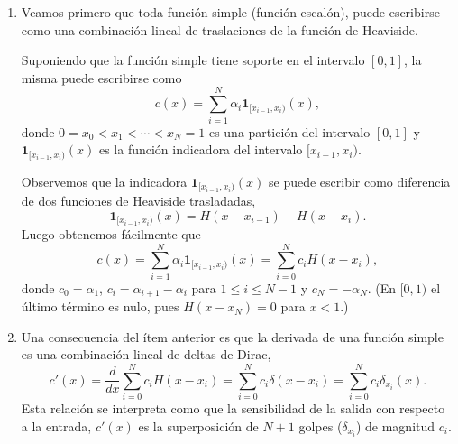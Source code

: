 \documentclass[12pt, a4paper]{amsbook}
\newcommand{\I}{{\mathbf 1}}
\theoremstyle{remark}
\theoremstyle{definition}
\numberwithin{section}{chapter}
\numberwithin{subsection}{section}
\numberwithin{equation}{section}
\numberwithin{figure}{chapter}
\begin{document}
\begin{enumerate}
\item Veamos primero que toda función simple (función escalón), puede escribirse como una combinación lineal de traslaciones de la función de Heaviside.

Suponiendo que la función simple tiene soporte en el intervalo $[0, 1]$, la misma puede escribirse como
$$
c(x) = \sum_{i=1}^N \alpha_i \I_{[x_{i-1}, x_i)}(x),
$$
donde $0=x_0<x_1<\cdots<x_N=1$ es una partición del intervalo $[0, 1]$ y $\I_{[x_{i-1}, x_i)}(x)$ es la función indicadora del intervalo $[x_{i-1}, x_i)$.

Observemos que la indicadora $\I_{[x_{i-1}, x_i)}(x)$ se puede escribir como diferencia de dos funciones de Heaviside trasladadas,
$$
\I_{[x_{i-1}, x_i)}(x) = H(x-x_{i-1}) - H(x-x_i).
$$
Luego obtenemos fácilmente que
\begin{equation}\label{8.1.1}
c(x) = \sum_{i=1}^N \alpha_i \I_{[x_{i-1}, x_i)}(x) = \sum_{i=0}^N c_i H(x-x_i),
\end{equation}
donde $c_0=\alpha_1$, $c_i=\alpha_{i+1}-\alpha_i$ para $1\le i\le N-1$ y $c_N=-\alpha_N$. (En $[0,1)$ el último término es nulo, pues $H(x-x_N)=0$ para $x<1$.)

\item Una consecuencia del ítem anterior es que la derivada de una función simple es una combinación lineal de deltas de Dirac,
$$
c'(x) = \frac{d}{dx} \sum_{i=0}^N c_i H(x-x_i) =  \sum_{i=0}^N c_i \delta(x-x_i) =  \sum_{i=0}^N c_i \delta_{x_i}(x).
$$
Esta relación se interpreta como que la sensibilidad de la salida con respecto a la entrada, $c'(x)$ es la superposición de $N+1$ golpes ($\delta_{x_i}$) de magnitud $c_i$.


\end{enumerate}
\end{document}
